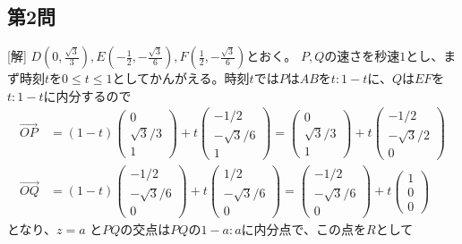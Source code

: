 \documentclass[../main.tex]{subfiles}
\begin{document}
\subsection*{第2問}
[解] $D(0, \frac{\sqrt{3}}{3}), E(-\frac{1}{2}, -\frac{\sqrt{3}}{6}), F(\frac{1}{2}, -\frac{\sqrt{3}}{6})$とおく。
$P, Q$の速さを秒速$1$とし、まず時刻$t$を$0 \le t \le 1$としてかんがえる。時刻$t$では$P$は$AB$を$t : 1-t$に、$Q$は$EF$を$t : 1-t$に内分するので
\begin{align*}
  \overrightarrow{OP} &= (1-t)
  \begin{pmatrix} 0 \\ \sqrt{3}/3 \\ 1
  \end{pmatrix} + t
  \begin{pmatrix} -1/2 \\ -\sqrt{3}/6 \\ 1
  \end{pmatrix} =
  \begin{pmatrix} 0 \\ \sqrt{3}/3 \\ 1
  \end{pmatrix} + t
  \begin{pmatrix} -1/2 \\ -\sqrt{3}/2 \\ 0
  \end{pmatrix} \\
  \overrightarrow{OQ} &= (1-t)
  \begin{pmatrix} -1/2 \\ -\sqrt{3}/6 \\ 0
  \end{pmatrix} + t
  \begin{pmatrix} 1/2 \\ -\sqrt{3}/6 \\ 0
  \end{pmatrix} =
  \begin{pmatrix} -1/2 \\ -\sqrt{3}/6 \\ 0
  \end{pmatrix} + t
  \begin{pmatrix} 1 \\ 0 \\ 0
  \end{pmatrix}
\end{align*}
となり、$z=a$ と$PQ$の交点は$PQ$の$1-a : a$に内分点で、この点を$R$として
\end{document}
